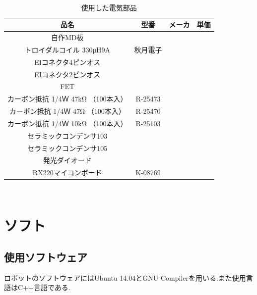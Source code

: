 \documentclass[12pt,oneside]{sotsuken_paper}
\begin{document}
\begin{table}[htp] 
 　\begin{center} 
    \caption{使用した電気部品} 
  \begin{tabular}{|c|c|c|c|} \hline 
品名 & 型番 & メーカ & 単価 \\  \hline 
自作MD板  &\\ \hline 
トロイダルコイル 330μH9A  & 秋月電子\\ \hline 
EIコネクタ4ピンオス  &\\ \hline 
EIコネクタ2ピンオス  &  \\ \hline 
FET & \\ \hline 
カーボン抵抗 1/4Ｗ 47kΩ （100本入） & R-25473 \\ \hline 
カーボン抵抗 1/4Ｗ 47Ω （100本入） &  R-25470\\ \hline 
カーボン抵抗 1/4Ｗ 10kΩ （100本入） & R-25103 \\ \hline 
セラミックコンデンサ103 &  \\ \hline 
セラミックコンデンサ105 &  \\ \hline 
発光ダイオード &  \\ \hline 
RX220マイコンボード & K-08769 \\ \hline 
  \end{tabular} 
　   \label{tab:denkibuhin} 
  \end{center} 
\end{table} 

\section{ソフト}
\subsection{使用ソフトウェア} 
ロボットのソフトウェアにはUbuntu 14.04とGNU Compilerを用いる.また使用言語はC++言語である. 
\end{document}
